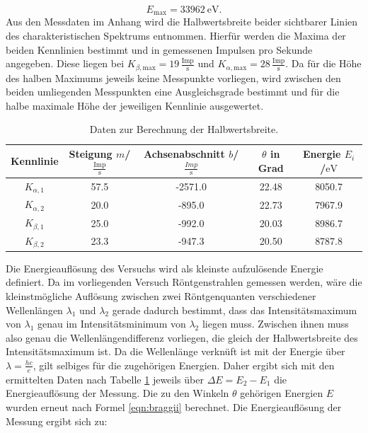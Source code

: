 \begin{equation*}
	E_\mathrm{max}=\SI{33962}{\electronvolt} \text{.}
\end{equation*}
Aus den Messdaten im Anhang wird die Halbwertsbreite beider sichtbarer Linien des charakteristischen Spektrums entnommen.
Hierfür werden die Maxima der beiden Kennlinien bestimmt und in gemessenen Impulsen pro Sekunde angegeben.
Diese liegen bei $K_{\beta,\mathrm{max}}=19 \, \frac{\mathrm{Imp}}{\si{\second}}$ und $K_{\alpha,\mathrm{max}}=28 \, \frac{\mathrm{Imp}}{\si{\second}}$.
Da für die Höhe des halben Maximums jeweils keine Messpunkte vorliegen, wird zwischen den beiden umliegenden Messpunkten eine Ausgleichsgrade bestimmt und für die halbe maximale Höhe der jeweiligen Kennlinie ausgewertet.
\begin{table}
	\centering
	\caption{Daten zur Berechnung der Halbwertsbreite.}
	\label{tab:moped}
	\begin{tabular}{ccccc}
		\toprule
Kennlinie&Steigung $m$/$ \frac{\mathrm{Imp}}{\si{\second}}$&Achsenabschnitt $b$/ $\frac{Imp}{\si{\second}}$&$\theta$ in Grad&Energie $E_i$/$\si{\electronvolt}$\\
\midrule
		$K_{\alpha,\mathrm{1}}$&57.5&-2571.0& 22.48&8050.7 \\
		$K_{\alpha,\mathrm{2}}$&20.0 &-895.0 &22.73&7967.9\\
		$K_{\beta,\mathrm{1}}$&25.0&-992.0&20.03&8986.7\\
		$K_{\beta,\mathrm{2}}$&23.3&-947.3&20.50&8787.8\\
		\bottomrule
\end{tabular}
\end{table}
Die Energieauflösung des Versuchs wird als kleinste aufzulösende Energie definiert.
Da im vorliegenden Versuch Röntgenstrahlen gemessen werden, wäre die kleinstmögliche Auflösung zwischen zwei Röntgenquanten verschiedener Wellenlängen $\lambda_1$ und $\lambda_2$ gerade dadurch bestimmt, dass das Intensitätsmaximum von $\lambda_1$ genau im Intensitätsminimum von $\lambda_2$ liegen muss. Zwischen ihnen muss also genau die Wellenlängendifferenz vorliegen, die gleich der Halbwertsbreite des Intensitätsmaximum ist. Da die Wellenlänge verknüft ist mit der Energie über $\lambda=\frac{hc}{e}$, gilt selbiges für die zugehörigen Energien.
Daher ergibt sich mit den ermittelten Daten nach Tabelle \ref{tab:moped} jeweils über $\Delta E=E_2-E_1$ die Energieauflösung der Messung.
Die zu den Winkeln $\theta$ gehörigen Energien $E$ wurden erneut nach Formel \eqref{eqn:braggii} berechnet.
Die Energieauflösung der Messung ergibt sich zu:
